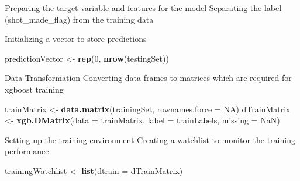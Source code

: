 \documentclass[
]{article}
\newenvironment{Shaded}{\begin{snugshade}}{\end{snugshade}}
\newcommand{\AttributeTok}[1]{\textcolor[rgb]{0.13,0.29,0.53}{#1}}
\newcommand{\ConstantTok}[1]{\textcolor[rgb]{0.56,0.35,0.01}{#1}}
\newcommand{\DecValTok}[1]{\textcolor[rgb]{0.00,0.00,0.81}{#1}}
\newcommand{\FunctionTok}[1]{\textcolor[rgb]{0.13,0.29,0.53}{\textbf{#1}}}
\newcommand{\NormalTok}[1]{#1}
\newcommand{\OtherTok}[1]{\textcolor[rgb]{0.56,0.35,0.01}{#1}}
\newcommand{\SpecialCharTok}[1]{\textcolor[rgb]{0.81,0.36,0.00}{\textbf{#1}}}
\begin{document}
Preparing the target variable and features for the model Separating the
label (shot\_made\_flag) from the training data

\begin{Shaded}
\end{Shaded}

Initializing a vector to store predictions

\begin{Shaded}
\begin{Highlighting}[]
\NormalTok{predictionVector }\OtherTok{\textless{}{-}} \FunctionTok{rep}\NormalTok{(}\DecValTok{0}\NormalTok{, }\FunctionTok{nrow}\NormalTok{(testingSet))}
\end{Highlighting}
\end{Shaded}

Data Transformation Converting data frames to matrices which are
required for xgboost training

\begin{Shaded}
\begin{Highlighting}[]
\NormalTok{trainMatrix }\OtherTok{\textless{}{-}} \FunctionTok{data.matrix}\NormalTok{(trainingSet, }\AttributeTok{rownames.force =} \ConstantTok{NA}\NormalTok{)}
\NormalTok{dTrainMatrix }\OtherTok{\textless{}{-}} \FunctionTok{xgb.DMatrix}\NormalTok{(}\AttributeTok{data =}\NormalTok{ trainMatrix, }\AttributeTok{label =}\NormalTok{ trainLabels, }\AttributeTok{missing =} \ConstantTok{NaN}\NormalTok{)}
\end{Highlighting}
\end{Shaded}

Setting up the training environment Creating a watchlist to monitor the
training performance

\begin{Shaded}
\begin{Highlighting}[]
\NormalTok{trainingWatchlist }\OtherTok{\textless{}{-}} \FunctionTok{list}\NormalTok{(}\AttributeTok{dtrain =}\NormalTok{ dTrainMatrix)}
\end{Highlighting}
\end{Shaded}
\end{document}
